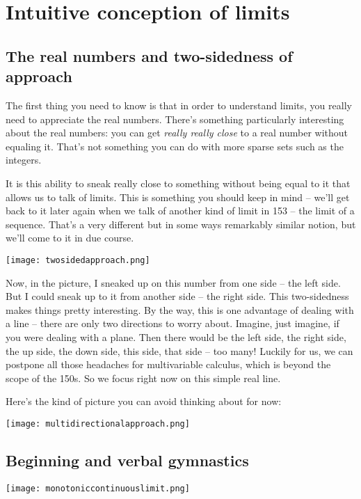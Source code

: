 \documentclass[10pt]{amsart}
\begin{document}
\section{Intuitive conception of limits}

\subsection{The real numbers and two-sidedness of approach}

The first thing you need to know is that in order to understand
limits, you really need to appreciate the real numbers. There's
something particularly interesting about the real numbers: you can get
{\em really really close} to a real number without equaling it. That's
not something you can do with more sparse sets such as the integers.

It is this ability to sneak really close to something without being
equal to it that allows us to talk of limits. This is something you
should keep in mind -- we'll get back to it later again when we talk
of another kind of limit in 153 -- the limit of a sequence. That's a
very different but in some ways remarkably similar notion, but we'll
come to it in due course.

\texttt{[image: twosidedapproach.png]}

Now, in the picture, I sneaked up on this number from one side -- the
left side. But I could sneak up to it from another side -- the right
side. This two-sidedness makes things pretty interesting. By the way,
this is one advantage of dealing with a line -- there are only two
directions to worry about. Imagine, just imagine, if you were dealing
with a plane. Then there would be the left side, the right side, the
up side, the down side, this side, that side -- too many! Luckily for
us, we can postpone all those headaches for multivariable calculus,
which is beyond the scope of the 150s. So we focus right now on this
simple real line.

Here's the kind of picture you can avoid thinking about for now:

\texttt{[image: multidirectionalapproach.png]}

\subsection{Beginning and verbal gymnastics}

\texttt{[image: monotoniccontinuouslimit.png]}
\end{document}
